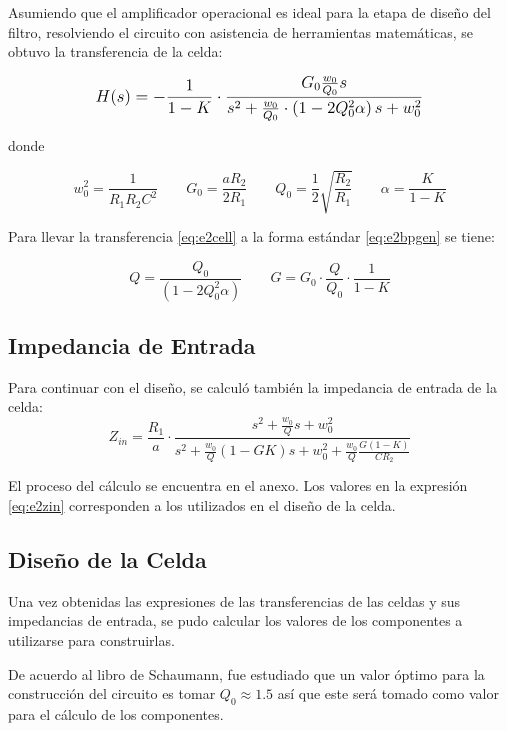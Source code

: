 Asumiendo que el amplificador operacional es ideal para la etapa de diseño del filtro, resolviendo el circuito con asistencia de herramientas matemáticas, se obtuvo la transferencia de la celda:

\begin{equation}
\mathlarger{
H(s)=-\frac{1}{1-K}\cdot\frac{G_0 \frac{w_0}{Q_0}s}{s^2 + \frac{w_0}{Q_0}\cdot\left(1-2 Q_0^2\alpha\right)s + w_0^2}
}
\label{eq:e2cell}
\end{equation}

donde

\begin{equation*}
w_0^2=\frac{1}{R_1R_2C^2} \qquad G_0 = \frac{aR_2}{2R_1} \qquad Q_0=\frac{1}{2}\sqrt{\frac{R_2}{R_1}} \qquad	\alpha=\frac{K}{1-K}
\end{equation*}

Para llevar la transferencia \eqref{eq:e2cell} a la forma estándar \eqref{eq:e2bpgen} se tiene:

\begin{equation*}
Q = \frac{Q_0}{\left(1-2 Q_0^2\alpha\right)} \qquad	G=G_0\cdot\frac{Q}{Q_0}\cdot\frac{1}{1-K}
\end{equation*}

\subsection{Impedancia de Entrada}

Para continuar con el diseño, se calculó también la impedancia de entrada de la celda:
\begin{equation}
Z_{in} = \frac{R_1}{a} \cdot \frac{s^2 + \frac{w_0}{Q}s + w_0^2}{s^2 + \frac{w_0}{Q}(1-GK) s + w_0^2 + \frac{w_0}{Q} \frac{G(1-K)}{C R_2}}
\label{eq:e2zin}
\end{equation}

El proceso del cálculo se encuentra en el anexo. Los valores en la expresión \eqref{eq:e2zin} corresponden a los utilizados en el diseño de la celda. 

\subsection{Diseño de la Celda}

Una vez obtenidas las expresiones de las transferencias de las celdas y sus impedancias de entrada, se pudo calcular los valores de los componentes a utilizarse para construirlas.

De acuerdo al libro de Schaumann, fue estudiado que un valor óptimo para la construcción del circuito es tomar $Q_0 \approx 1.5$ así que este será tomado como valor para el cálculo de los componentes.

